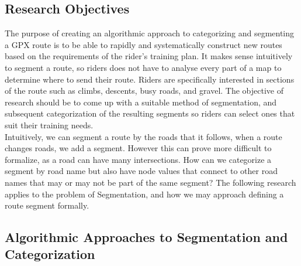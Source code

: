 \documentclass[11pt,twoside]{report}
\begin{document}
\subsection{Research Objectives}
The purpose of creating an algorithmic approach to categorizing and segmenting a GPX route is to be able to rapidly and systematically construct new routes based on the requirements of the rider's training plan.
It makes sense intuitively to segment a route, so riders does not have to analyse every part of a map to determine where to send their route. Riders are specifically interested in sections of the route such as climbs, descents, busy roads, and gravel.
The objective of research should be to come up with a suitable method of segmentation, and subsequent categorization of the resulting segments so riders can select ones that suit their training needs.
\\
Intuitively, we can segment a route by the roads that it follows, when a route changes roads, we add a segment. However this can prove more difficult to formalize, as
a road can have many intersections. How can we categorize a segment by road name but also have node values that connect to other road names that may or may not be part of the same segment?
The following research applies to the problem of Segmentation, and how we may approach defining a route segment formally.

\subsection{Algorithmic Approaches to Segmentation and Categorization}
\end{document}
